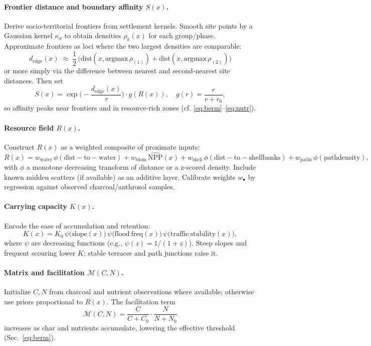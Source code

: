 \documentclass{article}
\begin{document}
\paragraph{Frontier distance and boundary affinity $S(x)$.}
Derive socio-territorial frontiers from settlement kernels. Smooth site points by a Gaussian kernel $\kappa_\sigma$ to obtain densities $\rho_k(x)$ for each group/phase. Approximate frontiers as loci where the two largest densities are comparable:
\[
d_{\mathrm{edge}}(x)\;\approx\;\frac{1}{2}\,\big(\mathrm{dist}(x,\mathrm{argmax}\,\rho_{(1)})+\mathrm{dist}(x,\mathrm{argmax}\,\rho_{(2)})\big)
\]
or more simply via the difference between nearest and second-nearest site distances. Then set
\[
S(x)=\exp\!\Big(-\frac{d_{\mathrm{edge}}(x)}{\tau}\Big)\cdot g(R(x)),
\quad g(r)=\frac{r}{r+r_0},
\]
so affinity peaks near frontiers and in resource-rich zones (cf. \eqref{eq:berm}–\eqref{eq:nutr}).

\paragraph{Resource field $R(x)$.}
Construct $R(x)$ as a weighted composite of proximate inputs:
\[
R(x)=w_\mathrm{water}\,\phi(\mathrm{dist\!-\!to\!-\!water})
+w_\mathrm{biom}\,\widehat{\mathrm{NPP}}(x)
+w_\mathrm{shell}\,\phi(\mathrm{dist\!-\!to\!-\!shell\!banks})
+w_\mathrm{paths}\,\phi(\mathrm{path\! density}),
\]
with $\phi$ a monotone decreasing transform of distance or a z-scored density. Include known midden scatters (if available) as an additive layer. Calibrate weights $w_\bullet$ by regression against observed charcoal/anthrosol samples.

\paragraph{Carrying capacity $K(x)$.}
Encode the ease of accumulation and retention:
\[
K(x)=K_0\,\psi\big(\mathrm{slope}(x)\big)\,\psi\big(\mathrm{flood\!~freq}(x)\big)\,\psi\big(\mathrm{traffic\!~stability}(x)\big),
\]
where $\psi$ are decreasing functions (e.g., $\psi(z)=1/(1+z)$). Steep slopes and frequent scouring lower $K$; stable terraces and path junctions raise it.

\paragraph{Matrix and facilitation $\mathcal{M}(C,N)$.}
Initialize $C,N$ from charcoal and nutrient observations where available; otherwise use priors proportional to $R(x)$. The facilitation term
\[
\mathcal{M}(C,N)=\frac{C}{C+C_0}\cdot\frac{N}{N+N_0}
\]
increases as char and nutrients accumulate, lowering the effective threshold (Sec.~\ref{eq:berm}).
\end{document}
